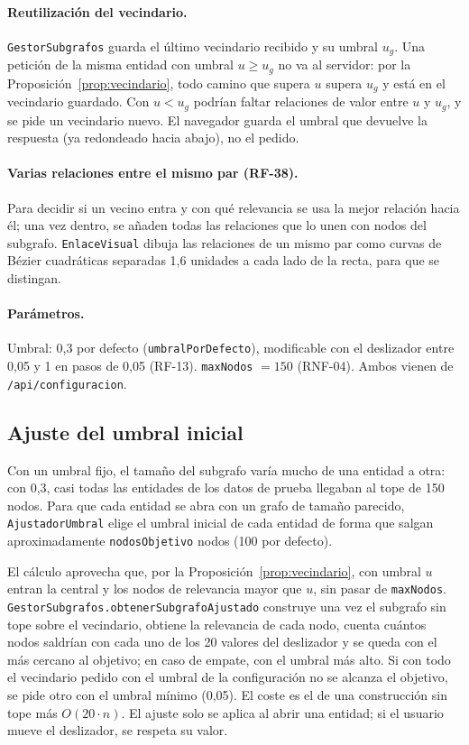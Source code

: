 \paragraph{Reutilización del vecindario.} \texttt{GestorSubgrafos} guarda el último vecindario recibido y su umbral $u_g$. Una petición de la misma entidad con umbral $u\ge u_g$ no va al servidor: por la Proposición~\ref{prop:vecindario}, todo camino que supera $u$ supera $u_g$ y está en el vecindario guardado. Con $u<u_g$ podrían faltar relaciones de valor entre $u$ y $u_g$, y se pide un vecindario nuevo. El navegador guarda el umbral que devuelve la respuesta (ya redondeado hacia abajo), no el pedido.

\paragraph{Varias relaciones entre el mismo par (RF-38).} Para decidir si un vecino entra y con qué relevancia se usa la mejor relación hacia él; una vez dentro, se añaden todas las relaciones que lo unen con nodos del subgrafo. \texttt{EnlaceVisual} dibuja las relaciones de un mismo par como curvas de Bézier cuadráticas separadas 1,6 unidades a cada lado de la recta, para que se distingan.

\paragraph{Parámetros.} Umbral: 0,3 por defecto (\texttt{umbralPorDefecto}), modificable con el deslizador entre 0,05 y 1 en pasos de 0,05 (RF-13). \texttt{maxNodos} $=150$ (RNF-04). Ambos vienen de \texttt{/api/configuracion}.

\subsection{Ajuste del umbral inicial}
\label{sec:alg-ajuste}

Con un umbral fijo, el tamaño del subgrafo varía mucho de una entidad a otra: con 0,3, casi todas las entidades de los datos de prueba llegaban al tope de 150 nodos. Para que cada entidad se abra con un grafo de tamaño parecido, \texttt{AjustadorUmbral} elige el umbral inicial de cada entidad de forma que salgan aproximadamente \texttt{nodosObjetivo} nodos (100 por defecto).

El cálculo aprovecha que, por la Proposición~\ref{prop:vecindario}, con umbral $u$ entran la central y los nodos de relevancia mayor que $u$, sin pasar de \texttt{maxNodos}. \texttt{GestorSubgrafos.obtenerSubgrafoAjustado} construye una vez el subgrafo sin tope sobre el vecindario, obtiene la relevancia de cada nodo, cuenta cuántos nodos saldrían con cada uno de los 20 valores del deslizador y se queda con el más cercano al objetivo; en caso de empate, con el umbral más alto. Si con todo el vecindario pedido con el umbral de la configuración no se alcanza el objetivo, se pide otro con el umbral mínimo (0,05). El coste es el de una construcción sin tope más $O(20\cdot n)$. El ajuste solo se aplica al abrir una entidad; si el usuario mueve el deslizador, se respeta su valor.

